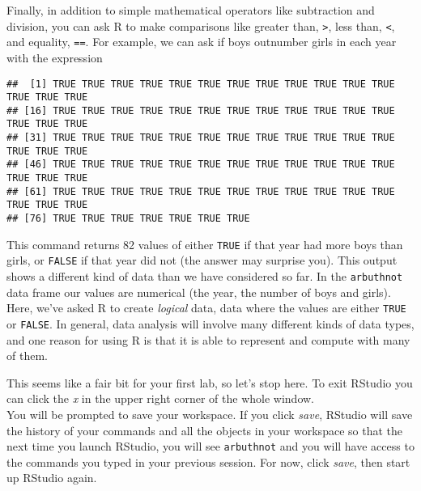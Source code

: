 \documentclass[
]{article}
\newenvironment{Shaded}{\begin{snugshade}}{\end{snugshade}}
\newcommand{\NormalTok}[1]{#1}
\newcommand{\OperatorTok}[1]{\textcolor[rgb]{0.81,0.36,0.00}{\textbf{#1}}}
\newcommand{\StringTok}[1]{\textcolor[rgb]{0.31,0.60,0.02}{#1}}
\begin{document}
Finally, in addition to simple mathematical operators like subtraction
and division, you can ask R to make comparisons like greater than,
\texttt{\textgreater{}}, less than, \texttt{\textless{}}, and equality,
\texttt{==}. For example, we can ask if boys outnumber girls in each
year with the expression

\begin{Shaded}
\end{Shaded}

\begin{verbatim}
##  [1] TRUE TRUE TRUE TRUE TRUE TRUE TRUE TRUE TRUE TRUE TRUE TRUE TRUE TRUE TRUE
## [16] TRUE TRUE TRUE TRUE TRUE TRUE TRUE TRUE TRUE TRUE TRUE TRUE TRUE TRUE TRUE
## [31] TRUE TRUE TRUE TRUE TRUE TRUE TRUE TRUE TRUE TRUE TRUE TRUE TRUE TRUE TRUE
## [46] TRUE TRUE TRUE TRUE TRUE TRUE TRUE TRUE TRUE TRUE TRUE TRUE TRUE TRUE TRUE
## [61] TRUE TRUE TRUE TRUE TRUE TRUE TRUE TRUE TRUE TRUE TRUE TRUE TRUE TRUE TRUE
## [76] TRUE TRUE TRUE TRUE TRUE TRUE TRUE
\end{verbatim}

This command returns 82 values of either \texttt{TRUE} if that year had
more boys than girls, or \texttt{FALSE} if that year did not (the answer
may surprise you). This output shows a different kind of data than we
have considered so far. In the \texttt{arbuthnot} data frame our values
are numerical (the year, the number of boys and girls). Here, we've
asked R to create \emph{logical} data, data where the values are either
\texttt{TRUE} or \texttt{FALSE}. In general, data analysis will involve
many different kinds of data types, and one reason for using R is that
it is able to represent and compute with many of them.

This seems like a fair bit for your first lab, so let's stop here. To
exit RStudio you can click the \emph{x} in the upper right corner of the
whole window.\\
You will be prompted to save your workspace. If you click \emph{save},
RStudio will save the history of your commands and all the objects in
your workspace so that the next time you launch RStudio, you will see
\texttt{arbuthnot} and you will have access to the commands you typed in
your previous session. For now, click \emph{save}, then start up RStudio
again.
\end{document}
